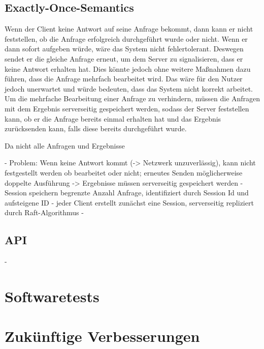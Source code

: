 \subsection{Exactly-Once-Semantics}
\label{exactly-once}

Wenn der Client keine Antwort auf seine Anfrage bekommt, dann kann er nicht feststellen, ob die Anfrage erfolgreich durchgeführt wurde oder nicht. Wenn er dann sofort aufgeben würde, wäre das System nicht fehlertolerant. Deswegen sendet er die gleiche Anfrage erneut, um dem Server zu signalisieren, dass er keine Antwort erhalten hat. Dies könnte jedoch ohne weitere Maßnahmen dazu führen, dass die Anfrage mehrfach bearbeitet wird. Das wäre für den Nutzer jedoch unerwartet und würde bedeuten, dass das System nicht korrekt arbeitet. Um die mehrfache Bearbeitung einer Anfrage zu verhindern, müssen die Anfragen mit dem Ergebnis serverseitig gespeichert werden, sodass der Server feststellen kann, ob er die Anfrage bereits einmal erhalten hat und das Ergebnis zurücksenden kann, falls diese bereits durchgeführt wurde.

Da nicht alle Anfragen und Ergebnisse  


- Problem: Wenn keine Antwort kommt (-> Netzwerk unzuverlässig), kann nicht festgestellt werden ob bearbeitet oder nicht; erneutes Senden möglicherweise doppelte Ausführung -> Ergebnisse müssen serverseitig gespeichert werden
- Session speichern begrenzte Anzahl Anfrage, identifiziert durch Session Id und aufsteigene ID
- jeder Client erstellt zunächst eine Session, serverseitig repliziert durch Raft-Algorithmus
- 

\subsection{API}
\label{api}

- 

\section{Softwaretests}

\section{Zukünftige Verbesserungen}